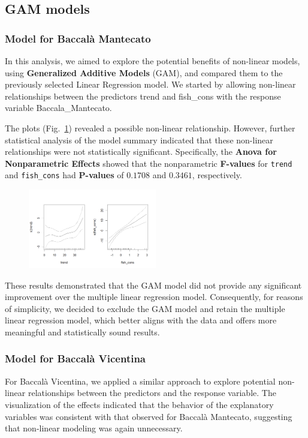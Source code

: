 \documentclass[10pt,twocolumn,letterpaper]{article}
\begin{document}
\subsection{GAM models}
\subsubsection{Model for Baccalà Mantecato}
In this analysis, we aimed to explore the potential benefits of non-linear models, using \textbf{Generalized Additive Models} (GAM), and compared them to the previously selected Linear Regression model. We started by allowing non-linear relationships between the predictors trend and fish\_cons with the response variable Baccala\_Mantecato.

The plots (Fig.~\ref{fig:GAM_M_LINEARITY}) revealed a possible non-linear relationship. However, further statistical analysis of the model summary indicated that these non-linear relationships were not statistically significant. Specifically, the \textbf{Anova for Nonparametric Effects} showed that the nonparametric \textbf{F-values} for \texttt{trend} and \texttt{fish\_cons} had \textbf{P-values} of $0.1708$ and $0.3461$, respectively. 

\begin{figure}[H]
    \centering
    \includegraphics[width=0.5\textwidth]{PlotsBEFD/GAM_M_LINEARITY.png} 
    \caption{}
    \label{fig:GAM_M_LINEARITY}
\end{figure}

These results demonstrated that the GAM model did not provide any significant improvement over the multiple linear regression model. Consequently, for reasons of simplicity, we decided to exclude the GAM model and retain the multiple linear regression model, which better aligns with the data and offers more meaningful and statistically sound results.

\subsubsection{Model for Baccalà Vicentina}
For Baccalà Vicentina, we applied a similar approach to explore potential non-linear relationships between the predictors and the response variable. The visualization of the effects indicated that the behavior of the explanatory variables was consistent with that observed for Baccalà Mantecato, suggesting that non-linear modeling was again unnecessary.
\end{document}
